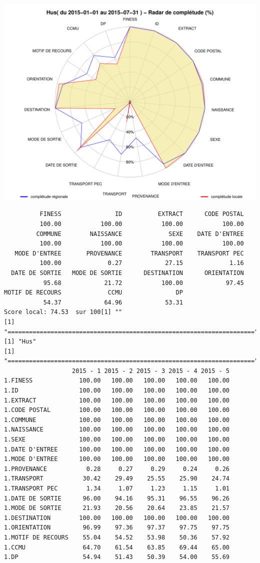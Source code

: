 \documentclass[]{article}
\begin{document}
\includegraphics{completude_files/figure-latex/finess-9.pdf}

\begin{verbatim}
          FINESS               ID          EXTRACT      CODE POSTAL 
          100.00           100.00           100.00           100.00 
         COMMUNE        NAISSANCE             SEXE    DATE D'ENTREE 
          100.00           100.00           100.00           100.00 
   MODE D'ENTREE       PROVENANCE        TRANSPORT    TRANSPORT PEC 
          100.00             0.27            27.15             1.16 
  DATE DE SORTIE   MODE DE SORTIE      DESTINATION      ORIENTATION 
           95.68            21.72           100.00            97.45 
MOTIF DE RECOURS             CCMU               DP 
           54.37            64.96            53.31 
Score local: 74.53  sur 100[1] ""
[1] "====================================================================="
[1] "Hus"
[1] "====================================================================="
                   2015 - 1 2015 - 2 2015 - 3 2015 - 4 2015 - 5
1.FINESS             100.00   100.00   100.00   100.00   100.00
1.ID                 100.00   100.00   100.00   100.00   100.00
1.EXTRACT            100.00   100.00   100.00   100.00   100.00
1.CODE POSTAL        100.00   100.00   100.00   100.00   100.00
1.COMMUNE            100.00   100.00   100.00   100.00   100.00
1.NAISSANCE          100.00   100.00   100.00   100.00   100.00
1.SEXE               100.00   100.00   100.00   100.00   100.00
1.DATE D'ENTREE      100.00   100.00   100.00   100.00   100.00
1.MODE D'ENTREE      100.00   100.00   100.00   100.00   100.00
1.PROVENANCE           0.28     0.27     0.29     0.24     0.26
1.TRANSPORT           30.42    29.49    25.55    25.90    24.74
1.TRANSPORT PEC        1.34     1.07     1.23     1.15     1.01
1.DATE DE SORTIE      96.00    94.16    95.31    96.55    96.26
1.MODE DE SORTIE      21.93    20.56    20.64    23.85    21.57
1.DESTINATION        100.00   100.00   100.00   100.00   100.00
1.ORIENTATION         96.99    97.36    97.37    97.75    97.75
1.MOTIF DE RECOURS    55.04    54.52    53.98    50.36    57.92
1.CCMU                64.70    61.54    63.85    69.44    65.00
1.DP                  54.94    51.43    50.39    54.00    55.69
\end{verbatim}
\end{document}
